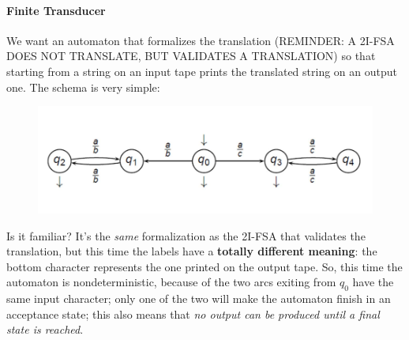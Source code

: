 \documentclass[10pt,a4paper]{article}
\begin{document}
					\paragraph{Finite Transducer}
						We want an automaton that formalizes the translation (REMINDER: A 2I-FSA DOES NOT TRANSLATE, BUT VALIDATES A TRANSLATION) so that starting from a string on an input tape prints the translated string on an output one. The schema is very simple:
						\begin{figure}[H]
							\centering
							\includegraphics[width = \textwidth]{./images/2IFSA.png}
						\end{figure}
						Is it familiar? It's the \emph{same} formalization as the 2I-FSA that validates the translation, but this time the labels have a \textbf{totally different meaning}: the bottom character represents the one printed on the output tape. So, this time the automaton is nondeterministic, because of the two arcs exiting from $q_0$ have the same input character; only one of the two will make the automaton finish in an acceptance state; this also means that \emph{no output can be produced until a final state is reached}.
						
\end{document}
